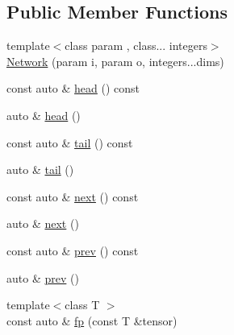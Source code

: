 \subsection*{Public Member Functions}
\begin{DoxyCompactItemize}
\item 
{\footnotesize template$<$class param , class... integers$>$ }\\\hyperlink{structBC_1_1nn_1_1Network_3_01Index_00_01DerivedNetwork_00_01LayerType_00_01lst_8_8_8_01_4_a8bea769fe11a2cc60d62917f270c4f28}{Network} (param i, param o, integers...\+dims)
\item 
const auto \& \hyperlink{structBC_1_1nn_1_1Network_3_01Index_00_01DerivedNetwork_00_01LayerType_00_01lst_8_8_8_01_4_afb91c97d1ee8ff064a5d6eebb9cc92b5}{head} () const 
\item 
auto \& \hyperlink{structBC_1_1nn_1_1Network_3_01Index_00_01DerivedNetwork_00_01LayerType_00_01lst_8_8_8_01_4_a325d35d50d74c3ee4c7b56b6bfc73b12}{head} ()
\item 
const auto \& \hyperlink{structBC_1_1nn_1_1Network_3_01Index_00_01DerivedNetwork_00_01LayerType_00_01lst_8_8_8_01_4_a2eb9e1a7290a1739383642735ed2093e}{tail} () const 
\item 
auto \& \hyperlink{structBC_1_1nn_1_1Network_3_01Index_00_01DerivedNetwork_00_01LayerType_00_01lst_8_8_8_01_4_ab8c3264557cd8ff08a89017ae237a921}{tail} ()
\item 
const auto \& \hyperlink{structBC_1_1nn_1_1Network_3_01Index_00_01DerivedNetwork_00_01LayerType_00_01lst_8_8_8_01_4_a391b0ab9fa93e17d38e1630b0831919d}{next} () const 
\item 
auto \& \hyperlink{structBC_1_1nn_1_1Network_3_01Index_00_01DerivedNetwork_00_01LayerType_00_01lst_8_8_8_01_4_a256b57ce56543c291536e73b25778696}{next} ()
\item 
const auto \& \hyperlink{structBC_1_1nn_1_1Network_3_01Index_00_01DerivedNetwork_00_01LayerType_00_01lst_8_8_8_01_4_ae3c0c28b85a4b216a581e6990ca8acc4}{prev} () const 
\item 
auto \& \hyperlink{structBC_1_1nn_1_1Network_3_01Index_00_01DerivedNetwork_00_01LayerType_00_01lst_8_8_8_01_4_acf925035671e9cae822486df040f6b1a}{prev} ()
\item 
{\footnotesize template$<$class T $>$ }\\const auto \& \hyperlink{structBC_1_1nn_1_1Network_3_01Index_00_01DerivedNetwork_00_01LayerType_00_01lst_8_8_8_01_4_ab5d1979f851d8e2d73c1cb2e066a6741}{fp} (const T \&tensor)
\item 

\end{DoxyCompactItemize}
